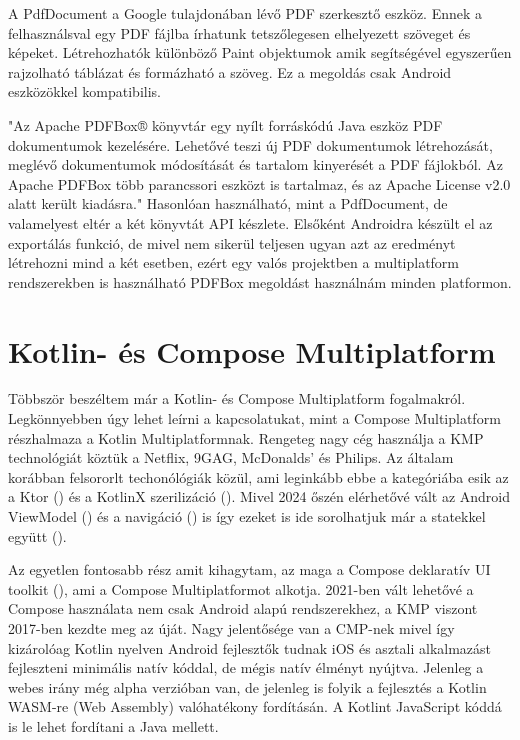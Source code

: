 A PdfDocument a Google tulajdonában lévő PDF szerkesztő eszköz. Ennek a felhasználsval egy PDF fájlba írhatunk tetszőlegesen elhelyezett szöveget és képeket.
Létrehozhatók különböző Paint objektumok amik segítségével egyszerűen rajzolható táblázat és formázható a szöveg. Ez a megoldás csak Android eszközökkel kompatibilis. 

"Az Apache PDFBox® könyvtár egy nyílt forráskódú Java eszköz PDF dokumentumok kezelésére. Lehetővé teszi új PDF dokumentumok létrehozását, meglévő dokumentumok módosítását és tartalom kinyerését a PDF fájlokból. Az Apache PDFBox több parancssori eszközt is tartalmaz, és az Apache License v2.0 alatt került kiadásra." \cite{PDFbox}
Hasonlóan használható, mint a PdfDocument, de valamelyest eltér a két könyvtát API készlete. Elsőként Androidra készült el az exportálás funkció, de mivel nem sikerül teljesen ugyan azt az eredményt létrehozni mind a két esetben, ezért egy valós projektben a multiplatform rendszerekben is használható PDFBox megoldást használnám minden platformon. 

\section{Kotlin- és Compose Multiplatform}

Többször beszéltem már a Kotlin- és Compose Multiplatform fogalmakról.
Legkönnyebben úgy lehet leírni a kapcsolatukat, mint a Compose Multiplatform részhalmaza a Kotlin Multiplatformnak.
Rengeteg nagy cég használja a KMP technológiát köztük a Netflix, 9GAG, McDonalds' és Philips. \cite{KotlinMultiplatformStable}
Az általam korábban felsororlt techonólógiák közül, ami leginkább ebbe a kategóriába esik az a Ktor () és a KotlinX szerilizáció ().
Mivel 2024 őszén elérhetővé vált az Android ViewModel () és a navigáció () is így ezeket is ide sorolhatjuk már a statekkel együtt ().

Az egyetlen fontosabb rész amit kihagytam, az maga a Compose deklaratív UI toolkit (), ami a Compose Multiplatformot alkotja.
2021-ben vált lehetővé a Compose használata nem csak Android alapú rendszerekhez, a KMP viszont 2017-ben kezdte meg az úját.
Nagy jelentősége van a CMP-nek mivel így kizárolóag Kotlin nyelven Android fejlesztők tudnak iOS és asztali alkalmazást fejleszteni minimális natív kóddal, de mégis natív élményt nyújtva.
Jelenleg a webes irány még alpha verzióban van, de jelenleg is folyik a fejlesztés a Kotlin WASM-re (Web Assembly) valóhatékony fordításán. A Kotlint JavaScript kóddá is le lehet fordítani a Java mellett.

